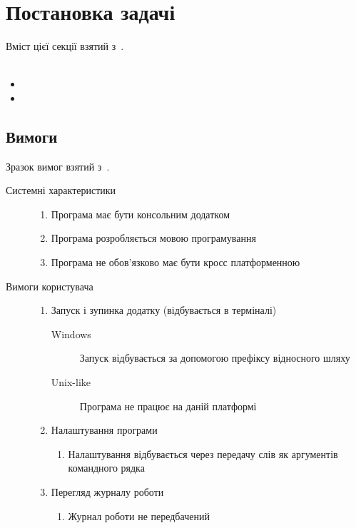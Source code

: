 \documentclass[../../../../document]{subfiles}
\begin{document}
	\chapter{Постановка задачі}
	Вміст цієї секції взятий з~\cite{CSHPiskunov}.\\
	\\
	\begin{itemize}
		\item
		\item
	\end{itemize}

	\section{Вимоги}
	Зразок вимог взятий з~\cite{kulikov}. 
	\begin{description}
		\item[Системні характеристики]\directenv%
			\begin{enumerate}
				\item Програма має бути консольним додатком
				\item Програма розробляється мовою програмування  
				\item Програма не обов'язково має бути кросс платформенною
			\end{enumerate}
		\item[Вимоги користувача]\directenv%
			\begin{enumerate}
				\item Запуск і зупинка додатку (відбувається в терміналі)
					\begin{description}
						\item[Windows]
							Запуск відбувається за допомогою префіксу відносного шляху 
						\item[Unix-like]
							Програма не працює на даній платформі
					\end{description}
				\item Налаштування програми
					\begin{enumerate}
						\item Налаштування відбувається через передачу слів як аргументів командного рядка
					\end{enumerate}
				\item Перегляд журналу роботи
					\begin{enumerate}
						\item Журнал роботи не передбачений
					\end{enumerate}

\end{enumerate}
\end{description}
\end{document}
